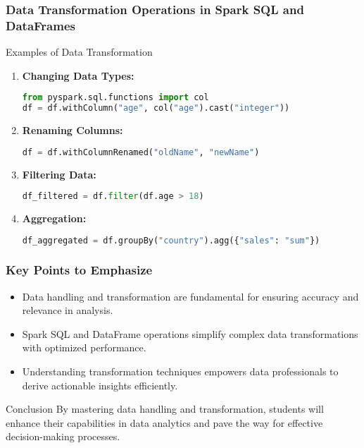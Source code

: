 \documentclass[aspectratio=169]{beamer}
\begin{document}
\begin{frame}[fragile]
    \frametitle{Data Transformation Operations in Spark SQL and DataFrames}
    \begin{block}{Examples of Data Transformation}
        \begin{enumerate}
            \item \textbf{Changing Data Types:}
            \begin{lstlisting}[language=Python]
from pyspark.sql.functions import col
df = df.withColumn("age", col("age").cast("integer"))
            \end{lstlisting}
            
            \item \textbf{Renaming Columns:}
            \begin{lstlisting}[language=Python]
df = df.withColumnRenamed("oldName", "newName")
            \end{lstlisting}

            \item \textbf{Filtering Data:}
            \begin{lstlisting}[language=Python]
df_filtered = df.filter(df.age > 18)
            \end{lstlisting}
            
            \item \textbf{Aggregation:}
            \begin{lstlisting}[language=Python]
df_aggregated = df.groupBy("country").agg({"sales": "sum"})
            \end{lstlisting}
        \end{enumerate}
    \end{block}
\end{frame}

\begin{frame}[fragile]
    \frametitle{Key Points to Emphasize}
    \begin{itemize}
        \item Data handling and transformation are fundamental for ensuring accuracy and relevance in analysis.
        \item Spark SQL and DataFrame operations simplify complex data transformations with optimized performance.
        \item Understanding transformation techniques empowers data professionals to derive actionable insights efficiently.
    \end{itemize}

    \begin{block}{Conclusion}
        By mastering data handling and transformation, students will enhance their capabilities in data analytics and pave the way for effective decision-making processes.
    \end{block}
\end{frame}
\end{document}
